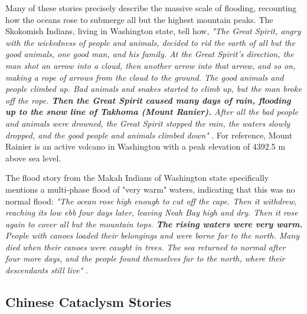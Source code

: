 \documentclass[10pt,twocolumn,letterpaper]{article}
\begin{document}
Many of these stories precisely describe the massive scale of flooding, recounting how the oceans rose to submerge all but the highest mountain peaks. The Skokomish Indians, living in Washington state, tell how, \textit{"The Great Spirit, angry with the wickedness of people and animals, decided to rid the earth of all but the good animals, one good man, and his family. At the Great Spirit's direction, the man shot an arrow into a cloud, then another arrow into that arrow, and so on, making a rope of arrows from the cloud to the ground. The good animals and people climbed up. Bad animals and snakes started to climb up, but the man broke off the rope. \textbf{Then the Great Spirit caused many days of rain, flooding up to the snow line of Takhoma (Mount Ranier).} After all the bad people and animals were drowned, the Great Spirit stopped the rain, the waters slowly dropped, and the good people and animals climbed down"} \cite{3}. For reference, Mount Rainier is an active volcano in Washington with a peak elevation of 4392.5 m above sea level.

The flood story from the Makah Indians of Washington state specifically mentions a multi-phase flood of "very warm" waters, indicating that this was no normal flood: \textit{"The ocean rose high enough to cut off the cape. Then it withdrew, reaching its low ebb four days later, leaving Neah Bay high and dry. Then it rose again to cover all but the mountain tops. \textbf{The rising waters were very warm.} People with canoes loaded their belongings and were borne far to the north. Many died when their canoes were caught in trees. The sea returned to normal after four more days, and the people found themselves far to the north, where their descendants still live"} \cite{3}.

\subsection{Chinese Cataclysm Stories}
\end{document}
